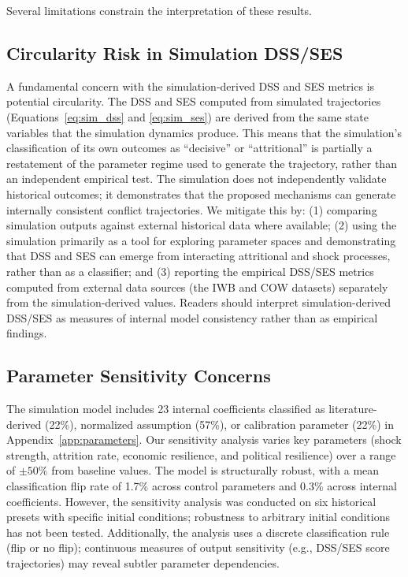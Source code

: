 Several limitations constrain the interpretation of these results.

\subsection{Circularity Risk in Simulation DSS/SES}

A fundamental concern with the simulation-derived DSS and SES metrics is potential circularity. The DSS and SES computed from simulated trajectories (Equations~\ref{eq:sim_dss} and \ref{eq:sim_ses}) are derived from the same state variables that the simulation dynamics produce. This means that the simulation's classification of its own outcomes as ``decisive'' or ``attritional'' is partially a restatement of the parameter regime used to generate the trajectory, rather than an independent empirical test. The simulation does not independently validate historical outcomes; it demonstrates that the proposed mechanisms can generate internally consistent conflict trajectories. We mitigate this by: (1) comparing simulation outputs against external historical data where available; (2) using the simulation primarily as a tool for exploring parameter spaces and demonstrating that DSS and SES can emerge from interacting attritional and shock processes, rather than as a classifier; and (3) reporting the empirical DSS/SES metrics computed from external data sources (the IWB and COW datasets) separately from the simulation-derived values. Readers should interpret simulation-derived DSS/SES as measures of internal model consistency rather than as empirical findings.

\subsection{Parameter Sensitivity Concerns}

The simulation model includes 23 internal coefficients classified as literature-derived (22\%), normalized assumption (57\%), or calibration parameter (22\%) in Appendix~\ref{app:parameters}. Our sensitivity analysis varies key parameters (shock strength, attrition rate, economic resilience, and political resilience) over a range of $\pm 50\%$ from baseline values. The model is structurally robust, with a mean classification flip rate of 1.7\% across control parameters and 0.3\% across internal coefficients. However, the sensitivity analysis was conducted on six historical presets with specific initial conditions; robustness to arbitrary initial conditions has not been tested. Additionally, the analysis uses a discrete classification rule (flip or no flip); continuous measures of output sensitivity (e.g., DSS/SES score trajectories) may reveal subtler parameter dependencies.

